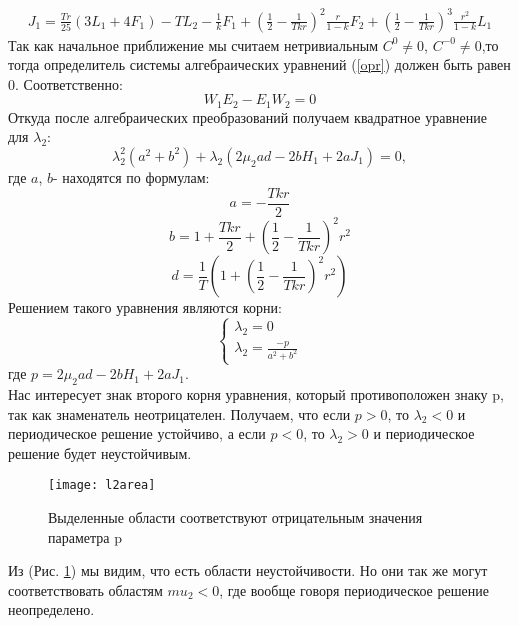 \documentclass[12pt]{article}
\begin{document}
\begin{multline*}
    J_1= \frac{T r}{25} (3 L_1 +4 F_1)-T L_2-\frac{1}{k} F_1 + (\frac{1}{2}-\frac{1}{T k r})^2 \frac{r}{1-k}F_2+ (\frac{1}{2}-\frac{1}{T k r})^3 \frac{r^2}{1-k}L_1 
\end{multline*}
Так как начальное приближение мы считаем нетривиальным $C^0 \neq 0$, $C^{-0} \neq 0$,то тогда определитель системы алгебраических уравнений (\ref{opr}) должен быть равен 0. Соответственно:
\begin{equation*}
    W_1 E_2 - E_1 W_2 =0
\end{equation*}
Откуда после алгебраических преобразований получаем квадратное уравнение для $\lambda_2$:
\begin{equation}
    \lambda_2 ^2 (a^2 + b^2) + \lambda_2 (2 \mu_2 a d - 2 b H_1 + 2 a J_1)=0,
\end{equation}
где $a$, $b$- находятся по формулам:
\begin{equation*}
    a=-\frac{T k r}{2}
\end{equation*}
\begin{equation*}
    b=1+\frac{T k r}{2} +(\frac{1}{2}- \frac{1}{T k r})^2 r^2
\end{equation*}
\begin{equation*}
    d=\frac{1}{T}(1 +(\frac{1}{2}- \frac{1}{T k r})^2 r^2)
\end{equation*}
Решением такого уравнения являются корни:
\begin{equation}
    \begin{cases}
    \lambda_2 =0 \\
    \lambda_2 = \frac{-p}{a^2+b^2}
    \end{cases}
\end{equation}
где $p=2 \mu_2 a d - 2 b H_1 + 2 a J_1$.\\
Нас интересует знак второго корня уравнения, который противоположен знаку p, так как знаменатель неотрицателен. Получаем, что если $p>0$, то $\lambda_2 <0$ и периодическое решение устойчиво, а если $p<0$, то $\lambda_2 >0$ и периодическое решение будет неустойчивым.
\begin{figure}
    \centering
    \texttt{[image: l2area]}
    \caption{Выделенные области соответствуют отрицательным значения параметра p }
    \label{fig:l2}
\end{figure}
Из (Рис. \ref{fig:l2}) мы видим, что есть области неустойчивости. Но они так же могут соответствовать областям $mu_2 <0$, где вообще говоря периодическое решение неопределено. \\
\end{document}
